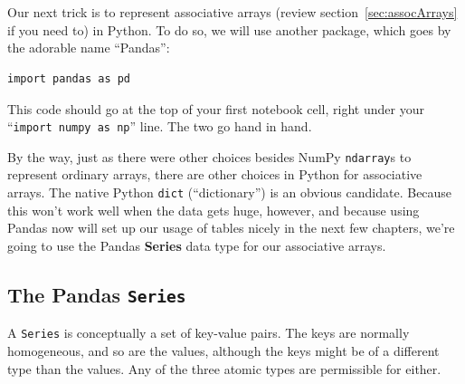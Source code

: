 

\chapter[\small Assoc.~arrays in Python (1 of 3)]{\LARGE\selectfont{Associative
arrays in Python (1 of 3)}}
\label{ch:assocArraysInPython1}


Our next trick is to represent associative arrays (review
section~\ref{sec:assocArrays} if you need to) in Python. To do so, we will
use another package, which goes by the adorable name ``Pandas'':

\begin{Verbatim}[fontsize=\small,samepage=true,frame=single,framesep=3mm]
import pandas as pd
\end{Verbatim}

This code should go at the top of your first notebook cell, right under your
``\texttt{import numpy as np}'' line. The two go hand in hand.


By the way, just as there were other choices besides NumPy \texttt{ndarray}s to
represent ordinary arrays, there are other choices in Python for associative
arrays. The native Python \texttt{dict} (``dictionary'') is an obvious
candidate. Because this won't work well when the data gets huge, however, and
because using Pandas now will set up our usage of tables nicely in the next
few chapters, we're going to use the Pandas \textbf{Series} data type for our
associative arrays.


\section{The Pandas \texttt{Series}}
\label{sec:creatingSeries}


A \texttt{Series} is conceptually a set of key-value pairs. The keys are
normally homogeneous, and so are the values, although the keys might be of a
different type than the values. Any of the three atomic types are permissible
for either.


